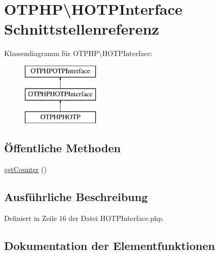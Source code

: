 \hypertarget{interface_o_t_p_h_p_1_1_h_o_t_p_interface}{}\section{O\+T\+P\+HP\textbackslash{}H\+O\+T\+P\+Interface Schnittstellenreferenz}
\label{interface_o_t_p_h_p_1_1_h_o_t_p_interface}
Klassendiagramm für O\+T\+P\+HP\textbackslash{}H\+O\+T\+P\+Interface\+:\begin{figure}[H]
\begin{center}
\leavevmode
\includegraphics[height=3.000000cm]{interface_o_t_p_h_p_1_1_h_o_t_p_interface}
\end{center}
\end{figure}
\subsection*{Öffentliche Methoden}
\begin{DoxyCompactItemize}
\item 
\mbox{\hyperlink{interface_o_t_p_h_p_1_1_h_o_t_p_interface_afbd9f89ad37a387a954dbe134e3807ff}{get\+Counter}} ()
\end{DoxyCompactItemize}


\subsection{Ausführliche Beschreibung}


Definiert in Zeile 16 der Datei H\+O\+T\+P\+Interface.\+php.



\subsection{Dokumentation der Elementfunktionen}
\mbox{\label{interface_o_t_p_h_p_1_1_h_o_t_p_interface_afbd9f89ad37a387a954dbe134e3807ff}} 
